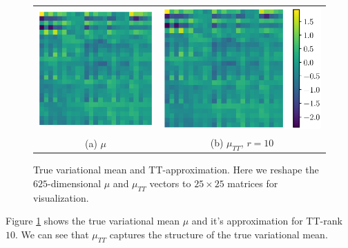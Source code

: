 \begin{figure}[!h]
  \begin{center}
      \begin{tabular}{cc}
          \includegraphics[trim = 80 0 80 0, clip, height=0.4\linewidth]{pics/true.eps} &
        \hspace{0.5cm}\includegraphics[trim = 80 0 0 0, clip, height=0.4\linewidth]{pics/tt.eps} \\
          (a) $\mu$ &
          (b) $\mu_{TT}$, $r = 10$
      \end{tabular}
  \end{center}
  \vspace{-0.4cm}
  \caption{True variational mean and TT-approximation. Here we reshape the 
    $625$-dimensional $\mu$ and $\mu_{TT}$ vectors
    to $25 \times 25$ matrices for visualization.}
  \label{true_and_tt}
  \vspace{-0.2cm}
\end{figure}

Figure \ref{true_and_tt} shows the true variational mean $\mu$ and it's 
approximation for TT-rank $10$.  We can see that $\mu_{TT}$ captures the 
structure of the true variational mean.

